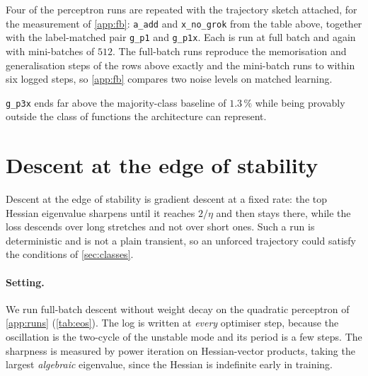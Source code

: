 \documentclass{article}
\begin{document}
Four of the perceptron runs are repeated with the trajectory sketch attached, for the measurement
of \cref{app:fb}: \texttt{a\_add} and \texttt{x\_no\_grok} from the table above, together with the
label-matched pair \texttt{g\_p1} and \texttt{g\_p1x}. Each is run at full batch and again with
mini-batches of $512$. The full-batch runs reproduce the memorisation and generalisation steps of the rows above exactly and the mini-batch
runs to within six logged steps, so \cref{app:fb} compares two noise levels on matched learning.

\texttt{g\_p3x} ends far above the majority-class baseline of $1.3\,\%$ while
being provably outside the class of functions the architecture can represent.

\section{Descent at the edge of stability}\label{app:eos}

Descent at the edge of stability \citep{cohen2021gradient} is gradient descent at a fixed rate: the
top Hessian eigenvalue sharpens until it reaches $2/\eta$ and then stays there, while the loss
descends over long stretches and not over short ones. Such a run is deterministic and is not a plain transient, so an unforced trajectory could satisfy the conditions of \cref{sec:classes}.

\paragraph{Setting.} We run full-batch descent without weight decay on the quadratic perceptron of
\cref{app:runs} (\cref{tab:eos}). The log is written at \emph{every} optimiser step, because the oscillation is the two-cycle of the unstable
mode and its period is a few steps. The sharpness is measured by power iteration on Hessian-vector
products, taking the largest \emph{algebraic} eigenvalue, since the Hessian is indefinite early in
training.
\end{document}
